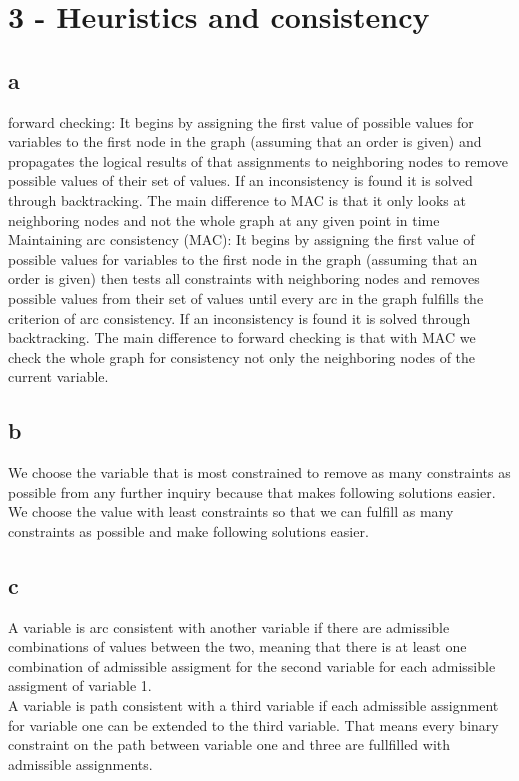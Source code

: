 \documentclass[a4paper]{article}
\begin{document}
\section*{3 - Heuristics and consistency}
\subsection*{a}
forward checking: It begins by assigning the first value of possible values for variables to the first node in the graph (assuming that an order is given) and propagates the logical results of that assignments to neighboring nodes to remove possible values of their set of values. If an inconsistency is found it is solved through backtracking. The main difference to MAC is that it only looks at neighboring nodes and not the whole graph at any given point in time\\
Maintaining arc consistency (MAC): It begins by assigning the first value of possible values for variables to the first node in the graph (assuming that an order is given) then tests all constraints with neighboring nodes and removes possible values from their set of values until every arc in the graph fulfills the criterion of arc consistency. If an inconsistency is found it is solved through backtracking. The main difference to forward checking is that with MAC we check the whole graph for consistency not only the neighboring nodes of the current variable.

\subsection*{b}
We choose the variable that is most constrained to remove as many constraints as possible from any further inquiry because that makes following solutions easier. \\
We choose the value with least constraints so that we can fulfill as many constraints as possible and make following solutions easier.

\subsection*{c}
A variable is arc consistent with another variable if there are admissible combinations of values between the two, meaning that there is at least one combination of admissible assigment for the second variable for each admissible assigment of variable 1. \\
A variable is path consistent with a third variable if each admissible assignment for variable one can be extended to the third variable. That means every binary constraint on the path between variable one and three are fullfilled with admissible assignments.
\end{document}

